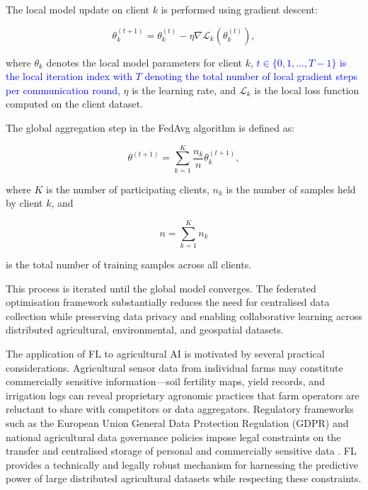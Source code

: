 \documentclass[land,article,submit,pdftex,moreauthors]{Definitions/mdpi}
\numberwithin{equation}{section}
\begin{document}
The local model update on client $k$ is performed using gradient descent:

\begin{equation}
\theta_k^{(t+1)}
=
\theta_k^{(t)}
-
\eta
\nabla \mathcal{L}_k(\theta_k^{(t)}),
\end{equation}

where $\theta_k$ denotes the local model parameters for client $k$, \textcolor{blue}{$t \in \{0, 1, \dots, T-1\}$ is the local iteration index with $T$ denoting the total number of local gradient steps per communication round,} $\eta$ is the learning rate, and $\mathcal{L}_k$ is the local loss function computed on the client dataset.

The global aggregation step in the FedAvg algorithm is defined as:

\begin{equation}
\theta^{(t+1)}
=
\sum_{k=1}^{K}
\frac{n_k}{n}
\theta_k^{(t+1)},
\end{equation}

where $K$ is the number of participating clients, $n_k$ is the number of samples held by client $k$, and

\begin{equation}
n=\sum_{k=1}^{K} n_k
\end{equation}

is the total number of training samples across all clients.

This process is iterated until the global model converges. The federated optimisation framework substantially reduces the need for centralised data collection while preserving data privacy and enabling collaborative learning across distributed agricultural, environmental, and geospatial datasets.

The application of FL to agricultural AI is motivated by several practical considerations. Agricultural sensor data from individual farms may constitute commercially sensitive information---soil fertility maps, yield records, and irrigation logs can reveal proprietary agronomic practices that farm operators are reluctant to share with competitors or data aggregators. Regulatory frameworks such as the European Union General Data Protection Regulation (GDPR) and national agricultural data governance policies impose legal constraints on the transfer and centralised storage of personal and commercially sensitive data \citep{regulation2016eu}. FL provides a technically and legally robust mechanism for harnessing the predictive power of large distributed agricultural datasets while respecting these constraints.
\end{document}
